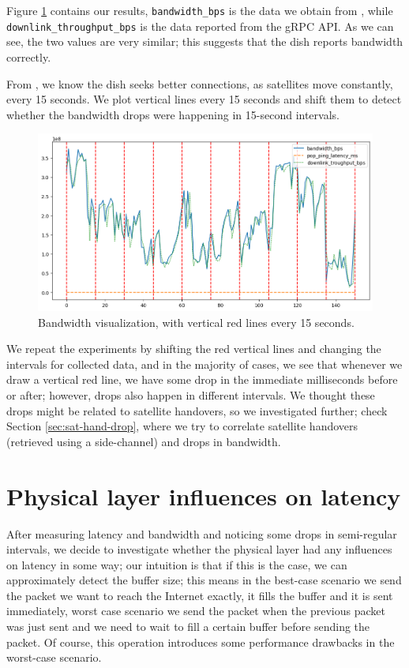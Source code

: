 \documentclass[IN,11pt,twoside,openright,idp,english]{tumthesis}
\begin{document}
Figure \ref{fig:vis-bw-15sec} contains our results, \texttt{bandwidth\_bps} is the data we obtain from , while \texttt{downlink\_throughput\_bps} is the data reported from the gRPC API. As we can see, the two values are very similar; this suggests that the dish reports bandwidth correctly.

From \cite{llc-application}, we know the dish seeks better connections, as satellites move constantly, every 15 seconds. We plot vertical lines every 15 seconds and shift them to detect whether the bandwidth drops were happening in 15-second intervals.

\begin{figure}
    \centering
    \includegraphics[width=1.0\columnwidth]{img/bw-15seconds.png}
    \caption{Bandwidth visualization, with vertical red lines every 15 seconds.}
    \label{fig:vis-bw-15sec}
\end{figure}

We repeat the experiments by shifting the red vertical lines and changing the intervals for collected data, and in the majority of cases, we see that whenever we draw a vertical red line, we have some drop in the immediate milliseconds before or after; however, drops also happen in different intervals. We thought these drops might be related to satellite handovers, so we investigated further; check Section \ref{sec:sat-hand-drop}, where we try to correlate satellite handovers (retrieved using a side-channel) and drops in bandwidth. 

\section{Physical layer influences on latency}

After measuring latency and bandwidth and noticing some drops in semi-regular intervals, we decide to investigate whether the physical layer had any influences on latency in some way; our intuition is that if this is the case, we can approximately detect the buffer size; this means in the best-case scenario we send the packet we want to reach the Internet exactly, it fills the buffer and it is sent immediately, worst case scenario we send the packet when the previous packet was just sent and we need to wait to fill a certain buffer before sending the packet. Of course, this operation introduces some performance drawbacks in the worst-case scenario.
\end{document}
